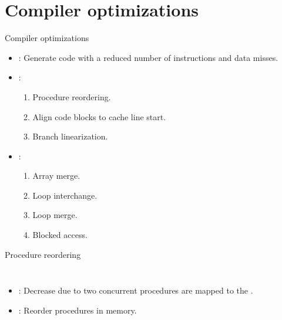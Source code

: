 \section{Compiler optimizations}

\begin{frame}[t]{Compiler optimizations}
\begin{itemize}
  \item {}:
        Generate code with a reduced number of instructions and data misses.

  \item {}: 
    \begin{enumerate}[1.]
      \item Procedure reordering.
      \item Align code blocks to cache line start.
      \item Branch linearization.
    \end{enumerate}

  \item {}: 
    \begin{enumerate}[1.]
      \item Array merge.
      \item Loop interchange.
      \item Loop merge.
      \item Blocked access.
    \end{enumerate}
\end{itemize}
\end{frame}

\begin{frame}[t]{Procedure reordering}
\begin{columns}


\begin{itemize}
  \item {}: Decrease  due to
        two concurrent procedures are mapped to the
        .

  \item {}: Reorder procedures in memory.

\end{itemize}

\pause


\end{columns}
\end{frame}

